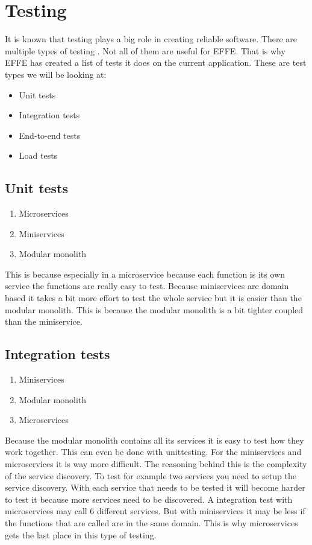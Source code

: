 \section{Testing}
\label{sec:Testing}

It is known that testing plays a big role in creating reliable software. There are multiple types of testing \cite{testTypes}. Not all of them are useful for EFFE. That is why EFFE has created a list of tests it does on the current application. These are test types we will be looking at:

\begin{itemize}
        \item Unit tests
        \item Integration tests
        \item End-to-end tests
        \item Load tests
\end{itemize}

\subsection{Unit tests}
\label{sec:UnitTests}

\begin{enumerate}
        \item Microservices
        \item Miniservices
        \item Modular monolith
\end{enumerate}

This is because especially in a microservice because each function is its own service the functions are really easy to test. Because miniservices are domain based it takes a bit more effort to test the whole service but it is easier than the modular monolith. This is because the modular monolith is a bit tighter coupled than the miniservice.

\subsection{Integration tests}

\begin{enumerate}
        \item Miniservices
        \item Modular monolith
        \item Microservices
\end{enumerate}

Because the modular monolith contains all its services it is easy to test how they work together. This can even be done with unittesting. For the miniservices and microservices it is way more difficult. The reasoning behind this is the complexity of the service discovery. To test for example two services you need to setup the service discovery. With each service that needs to be tested it will become harder to test it because more services need to be discovered. A integration test with microservices may call 6 different services. But with miniservices it may be less if the functions that are called are in the same domain. This is why microservices gets the last place in this type of testing.

